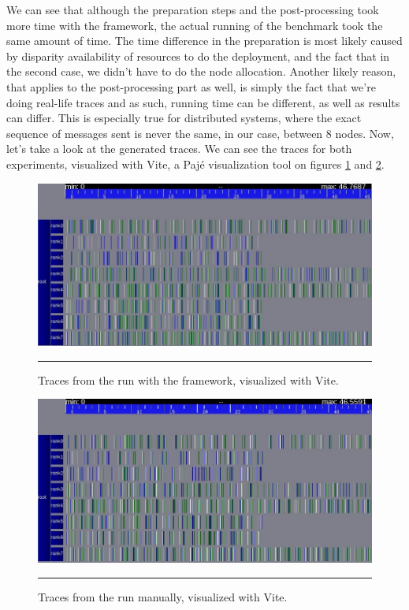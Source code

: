 We can see that although the preparation steps and the post-processing
took more time with the framework, the actual running of the benchmark
took the same amount of time. The time difference in the preparation
is most likely caused by disparity availability of resources to do the
deployment, and the fact that in the second case, we didn't have to do
the node allocation. Another likely reason, that applies to the
post-processing part as well, is simply the fact that we're doing
real-life traces and as such, running time can be different, as well
as results can differ. This is especially true for distributed
systems, where the exact sequence of messages sent is never the same,
in our case, between 8 nodes.
Now, let's take a look at the generated traces. We can see the traces
for both experiments, visualized with Vite, a Pajé visualization tool
on figures \ref{fig:fex_traces} and \ref{fig:mex_traces}.

\begin{figure}[htbp]
  \centering
    \includegraphics[scale=0.7]{./Figures/lu_B_8_framework.jpg}
    \rule{35em}{0.5pt}
  \caption[Traces from the experiment run with the framework]{Traces
    from the run with the framework, visualized with Vite.}
  \label{fig:fex_traces}
\end{figure}

\begin{figure}[htbp]
  \centering
    \includegraphics[scale=0.7]{./Figures/lu_B_8_manual1.jpg}
    \rule{35em}{0.5pt}
  \caption[Traces from the experiment run manually]{Traces from the
    run manually, visualized with Vite.}
  \label{fig:mex_traces}
\end{figure}

